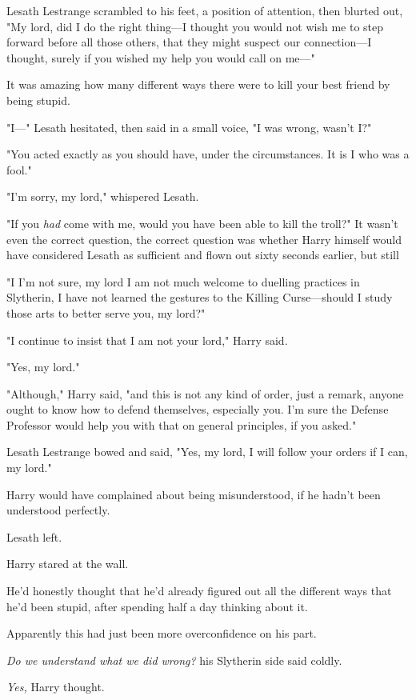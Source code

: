 Lesath Lestrange scrambled to his feet, a position of attention, then blurted
out, "My lord, did I do the right thing—I thought you would not wish me to
step forward before all those others, that they might suspect our
connection—I thought, surely if you wished my help you would call on me—"

It was amazing how many different ways there were to kill your best friend by
being stupid.

"I—" Lesath hesitated, then said in a small voice, "I was wrong, wasn't I?"

"You acted exactly as you should have, under the circumstances. It is I who was
a fool."

"I'm sorry, my lord," whispered Lesath.

"If you \emph{had} come with me, would you have been able to kill the troll?"
It wasn't even the correct question, the correct question was whether Harry
himself would have considered Lesath as sufficient and flown out sixty seconds
earlier, but still{\el}

"I{\el} I'm not sure, my lord{\el} I am not much welcome to duelling
practices in Slytherin, I have not learned the gestures to the Killing
Curse—should I study those arts to better serve you, my lord?"

"I continue to insist that I am not your lord," Harry said.

"Yes, my lord."

"Although," Harry said, "and this is not any kind of order, just a remark,
anyone ought to know how to defend themselves, especially you. I'm sure the
Defense Professor would help you with that on general principles, if you asked."

Lesath Lestrange bowed and said, "Yes, my lord, I will follow your orders if I
can, my lord."

Harry would have complained about being misunderstood, if he hadn't been
understood perfectly.

Lesath left.

Harry stared at the wall.

He'd honestly thought that he'd already figured out all the different ways that
he'd been stupid, after spending half a day thinking about it.

Apparently this had just been more overconfidence on his part.

\emph{Do we understand what we did wrong?} his Slytherin side said coldly.

\emph{Yes,} Harry thought.


